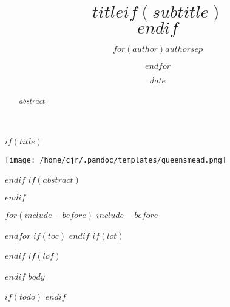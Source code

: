\documentclass[12pt,a4paper]{article}
\title{$title$$if(subtitle)$\\\vspace{0.5em}{\large $subtitle$}$endif$}
\author{$for(author)$$author$$sep$ \and $endfor$}
\date{$date$}
\makeatletter
\def\maketitle{%
  \begin{centering}
	\texttt{[image: /home/cjr/.pandoc/templates/queensmead.png]}
    \vskip 0.2cm
    {\LARGE \@title\par}%
    {\large \@author\par}%
    \normalfont
    {\normalsize \@date\par}%
  \end{centering}%
  }
\makeatother
\begin{document}
$if(title)$
\maketitle
$endif$
$if(abstract)$
\begin{abstract}
$abstract$
\end{abstract}
$endif$

$for(include-before)$
$include-before$

$endfor$
$if(toc)$
{
\hypersetup{linkcolor=blue}
\setcounter{tocdepth}{$toc-depth$}
\tableofcontents
}
$endif$
$if(lot)$
\listoftables
$endif$
$if(lof)$
\listoffigures
$endif$
$body$

$if(todo)$
\newpage
{}
$endif$
\end{document}
